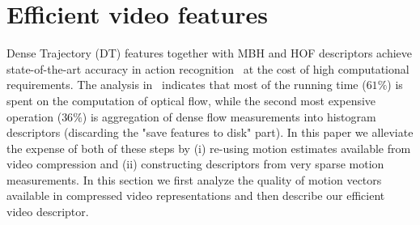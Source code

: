 
\section{Efficient video features}
\label{sec:features}

Dense Trajectory (DT) features together with MBH and HOF descriptors achieve state-of-the-art accuracy in action recognition~\cite{Wang12} at the cost of high computational requirements.
The analysis in~\cite{Wang12} indicates that most of the running time ($61\%$) is spent on the computation of optical flow, while the second most expensive operation ($36\%$) is aggregation of dense flow measurements into histogram descriptors (discarding the "save features to disk" part). In this paper we alleviate the expense of both of these steps by (i) re-using motion estimates available from video compression and (ii) constructing descriptors from very sparse motion measurements. %
In this section we first analyze the quality of motion vectors available in compressed video representations and then describe our efficient video descriptor.



